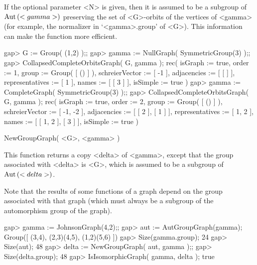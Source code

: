 If the optional  parameter  <N>  is given, then  it is assumed  to  be  a
subgroup of  ${\rm Aut}\,(<gamma>)$  preserving  the  set of  <G>-orbits  of the
vertices  of  <gamma> (for  example, the normalizer in `<gamma>.group' of
<G>).  This information can make the function more efficient.

\beginexample
gap> G := Group( (1,2) );;
gap> gamma := NullGraph( SymmetricGroup(3) );;
gap> CollapsedCompleteOrbitsGraph( G, gamma );
rec(
  isGraph := true,
  order := 1,
  group := Group( [ () ] ),
  schreierVector := [ -1 ],
  adjacencies := [ [  ] ],
  representatives := [ 1 ],
  names := [ [ 3 ] ],
  isSimple := true )
gap> gamma := CompleteGraph( SymmetricGroup(3) );;
gap> CollapsedCompleteOrbitsGraph( G, gamma );
rec(
  isGraph := true,
  order := 2,
  group := Group( [ () ] ),
  schreierVector := [ -1, -2 ],
  adjacencies := [ [ 2 ], [ 1 ] ],
  representatives := [ 1, 2 ],
  names := [ [ 1, 2 ], [ 3 ] ],
  isSimple := true )
\endexample


\>NewGroupGraph( <G>, <gamma> )

This  function returns a  copy <delta> of <gamma>,  except that the group
associated with  <delta> is <G>,  which  is assumed to be  a subgroup  of
${\rm Aut}\,(<delta>)$.

Note that the results of some functions  of  a graph  depend on the group
associated  with  that graph  (which must always  be  a  subgroup  of the
automorphism group of the graph).

\beginexample
gap> gamma := JohnsonGraph(4,2);;
gap> aut := AutGroupGraph(gamma);
Group([ (3,4), (2,3)(4,5), (1,2)(5,6) ])
gap> Size(gamma.group);
24
gap> Size(aut);
48
gap> delta := NewGroupGraph( aut, gamma );;
gap> Size(delta.group);
48
gap> IsIsomorphicGraph( gamma, delta );
true
\endexample
